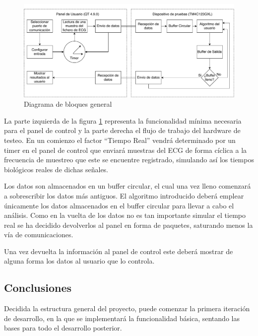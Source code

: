         \begin{figure}[H]  
            \centering
                \includegraphics[width =\linewidth]{figuras/InternBlockDiagram.pdf}
                \caption{Diagrama de bloques general}
                \label{fig:InternalBlocksDiagram}
        \end{figure}
 
        La parte izquierda de la figura \ref{fig:InternalBlocksDiagram} representa la funcionalidad mínima necesaria para el panel de control y la parte derecha el flujo de trabajo del hardware de testeo. En un comienzo el factor “Tiempo Real” vendrá determinado por un timer en el panel de control que enviará muestras del ECG de forma cíclica a la frecuencia de muestreo que este se encuentre registrado, simulando así los tiempos biológicos reales de dichas señales. 
        
        Los datos son almacenados en un buffer circular, el cual una vez lleno comenzará a sobrescribir los datos más antiguos. El algoritmo introducido deberá emplear únicamente los datos almacenados en el buffer circular para llevar a cabo el análisis. Como en la vuelta de los datos no es tan importante simular el tiempo real se ha decidido devolverlos al panel en forma de paquetes, saturando menos la vía de comunicaciones.
        
        Una vez devuelta la información al panel de control este deberá mostrar de alguna forma los datos al usuario que lo controla.        

        \subsection{Conclusiones}

        Decidida la estructura general del proyecto, puede comenzar la primera iteración de desarrollo, en la que se implementará la funcionalidad básica, sentando las bases para todo el desarrollo posterior.